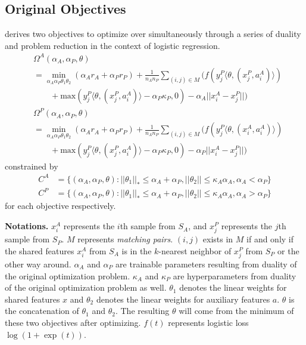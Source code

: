 \documentclass{article}
\begin{document}
\subsection{Original Objectives}
\citep{awasthi2022distributionally} derives two 
objectives to optimize over simultaneously through a series of duality and problem reduction in 
the context of logistic regression.  
\begin{align*}
  &\Omega^A(\alpha_A, \alpha_P, \theta) 
  \\ &= \min_{\alpha_{A}\alpha_{P}\theta_{1}\theta_{2}}(\alpha_{A}r_{A}+\alpha_{P}r_{P})+\frac{1}{n_{A}n_{P}}\sum_{(i,j) \in M}(f(y_{j}^P\langle \theta , (x_j^P, a_i^A)\rangle)
  \\ & \qquad +\mathrm{max}(y_{j}^{P}\langle \theta, (x_j^P,a_{i}^{A}) \rangle -\alpha_{P}\kappa_{P},0)-\alpha_A||x_{i}^{A}-x_{j}^{P}||)
  \\ &\Omega^P(\alpha_A, \alpha_P, \theta) 
  \\ &= \min_{\alpha_{A}\alpha_{P}\theta_{1}\theta_{2}}(\alpha_{A}r_{A}+\alpha_{P}r_{P})+\frac{1}{n_{A}n_{P}}\sum_{(i,j) \in M}(f(y_{j}^P\langle \theta , (x_i^A, a_i^A)\rangle)
  \\ & \qquad +\mathrm{max}(y_{j}^{P}\langle \theta, (x_j^P,a_{i}^{A}) \rangle -\alpha_{P}\kappa_{P},0)-\alpha_P||x_{i}^{A}-x_{j}^{P}||)
\end{align*}
constrained by
\begin{align*}
  C^A &= \{(\alpha_A, \alpha_P, \theta) : ||\theta_1||_* \le \alpha_A + \alpha_P, ||\theta_2|| \le \kappa_A \alpha_A, \alpha_A < \alpha_P \}
  \\ C^P &= \{(\alpha_A, \alpha_P, \theta) : ||\theta_1||_* \le \alpha_A + \alpha_P, ||\theta_2|| \le \kappa_A \alpha_A, \alpha_A > \alpha_P \}
\end{align*}
for each objective respectively.

\textbf{Notations.} $x_i^A$ represents the $i$th sample from $S_A$, and $x_j^P$ represents the $j$th sample from $S_P$.
$M$ represents \textit{matching pairs}. $(i, j)$ exists in $M$ if and only if the shared features $x_i^A$ from $S_A$
is in the $k$-nearest neighbor of $x_j^P$ from $S_P$ or the other way around. $\alpha_A$ and $\alpha_P$ are 
trainable parameters resulting from duality of the original optimization problem. $\kappa_A$ and $\kappa_P$ 
are hyperparameters from duality of the original optimization problem as well. $\theta_1$ denotes the 
linear weights for shared features $x$ and $\theta_2$ denotes the linear weights for auxiliary features 
$a$. $\theta$ is the concatenation of $\theta_1$ and $\theta_2$.
The resulting $\theta$ will come from the minimum of these two objectives after optimizing. 
$f(t)$ represents logistic loss $\log (1 + \exp(t))$.
\end{document}
